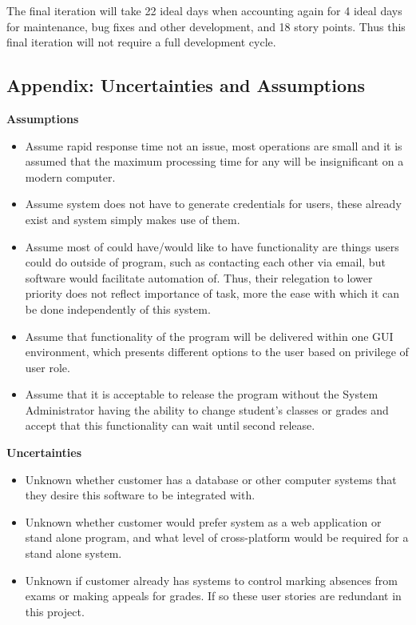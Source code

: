 \documentclass[11pt]{article}
\begin{document}
The final iteration will take 22 ideal days when accounting again for 4 ideal days for maintenance, bug fixes and other development, and 18 story points. Thus this final iteration will not require a full development cycle.
\newpage
\subsection*{Appendix: Uncertainties and Assumptions}
\textbf{Assumptions}
\begin{itemize}
\item{Assume rapid response time not an issue, most operations are small and it is assumed that the maximum processing time for any will be insignificant on a modern computer.}\item{Assume system does not have to generate credentials for users, these already exist and system simply makes use of them.}
\item{Assume most of could have/would like to have functionality are things users could do outside of program, such as contacting each other via email, but software would facilitate automation of. Thus, their relegation to lower priority does not reflect importance of task, more the ease with which it can be done independently of this system.}
\item{Assume that functionality of the program will be delivered within one GUI environment, which presents different options to the user based on privilege of user role.}
\item{Assume that it is acceptable to release the program without the System Administrator having the ability to change student's classes or grades and accept that this functionality can wait until second release.}
\end{itemize}
\textbf{Uncertainties}
\begin{itemize}
\item{Unknown whether customer has a database or other computer systems that they desire this software to be integrated with.}
\item{Unknown whether customer would prefer system as a web application or stand alone program, and what level of cross-platform would be required for a stand alone system.}
\item{Unknown if customer already has systems to control marking absences from exams or making appeals for grades. If so these user stories are redundant in this project.}
\end{itemize}
\end{document}
